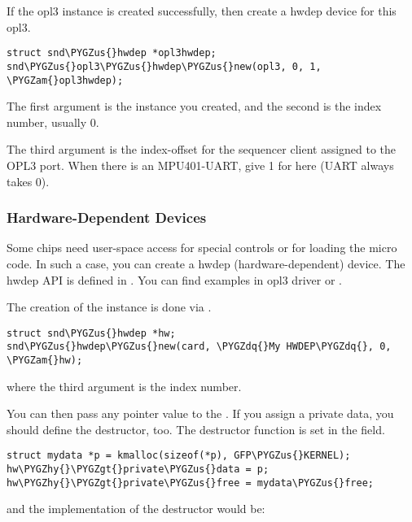 \documentclass[a4paper,8pt,english]{sphinxmanual}
\def\PYGZus{\char`\_}
\def\PYGZam{\char`\&}
\def\PYGZgt{\char`\>}
\def\PYGZhy{\char`\-}
\def\PYGZdq{\char`\"}
\begin{document}
If the opl3 instance is created successfully, then create a hwdep device
for this opl3.

\begin{Verbatim}[commandchars=\\\{\}]
struct snd\PYGZus{}hwdep *opl3hwdep;
snd\PYGZus{}opl3\PYGZus{}hwdep\PYGZus{}new(opl3, 0, 1, \PYGZam{}opl3hwdep);
\end{Verbatim}

The first argument is the  instance you created, and the
second is the index number, usually 0.

The third argument is the index-offset for the sequencer client assigned
to the OPL3 port. When there is an MPU401-UART, give 1 for here (UART
always takes 0).


\subsubsection{Hardware-Dependent Devices}
\label{sound/kernel-api/writing-an-alsa-driver:hardware-dependent-devices}
Some chips need user-space access for special controls or for loading
the micro code. In such a case, you can create a hwdep
(hardware-dependent) device. The hwdep API is defined in
. You can find examples in opl3 driver or
.

The creation of the  instance is done via
.

\begin{Verbatim}[commandchars=\\\{\}]
struct snd\PYGZus{}hwdep *hw;
snd\PYGZus{}hwdep\PYGZus{}new(card, \PYGZdq{}My HWDEP\PYGZdq{}, 0, \PYGZam{}hw);
\end{Verbatim}

where the third argument is the index number.

You can then pass any pointer value to the . If you
assign a private data, you should define the destructor, too. The
destructor function is set in the  field.

\begin{Verbatim}[commandchars=\\\{\}]
struct mydata *p = kmalloc(sizeof(*p), GFP\PYGZus{}KERNEL);
hw\PYGZhy{}\PYGZgt{}private\PYGZus{}data = p;
hw\PYGZhy{}\PYGZgt{}private\PYGZus{}free = mydata\PYGZus{}free;
\end{Verbatim}

and the implementation of the destructor would be:
\end{document}
